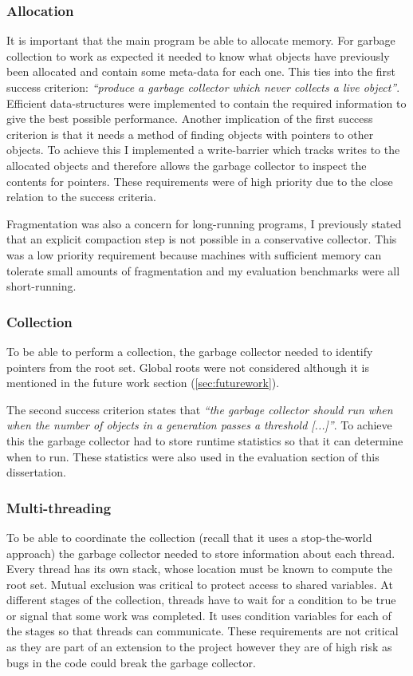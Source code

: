 \documentclass[../diss.tex]{subfiles}
\begin{document}
\subsubsection{Allocation}

It is important that the main program be able to allocate memory. For garbage collection to work as expected it needed to know what objects have previously been allocated and contain some meta-data for each one. This ties into the first success criterion: \emph{``produce a garbage collector which never collects a live object''}. Efficient data-structures were implemented to contain the required information to give the best possible performance. Another implication of the first success criterion is that it needs a method of finding objects with pointers to other objects. To achieve this I implemented a write-barrier which tracks writes to the allocated objects and therefore allows the garbage collector to inspect the contents for pointers. These requirements were of high priority due to the close relation to the success criteria.

Fragmentation was also a concern for long-running programs, I previously stated that an explicit compaction step is not possible in a conservative collector. This was a low priority requirement because machines with sufficient memory can tolerate small amounts of fragmentation and my evaluation benchmarks were all short-running.

\subsubsection{Collection}

To be able to perform a collection, the garbage collector needed to identify pointers from the root set. Global roots were not considered although it is mentioned in the future work section (\cref{sec:futurework}).

The second success criterion states that \emph{``the garbage collector should run when when the number of objects in a generation passes a threshold [...]''}. To achieve this the garbage collector had to store runtime statistics so that it can determine when to run. These statistics were also used in the evaluation section of this dissertation.

\subsubsection{Multi-threading}

To be able to coordinate the collection (recall that it uses a stop-the-world approach) the garbage collector needed to store information about each thread. Every thread has its own stack, whose location must be known to compute the root set. Mutual exclusion was critical to protect access to shared variables. At different stages of the collection, threads have to wait for a condition to be true or signal that some work was completed. It uses condition variables for each of the stages so that threads can communicate. These requirements are not critical as they are part of an extension to the project however they are of high risk as bugs in the code could break the garbage collector.
\end{document}
